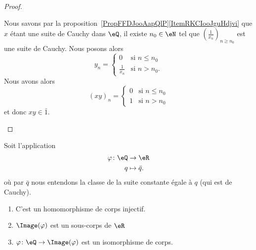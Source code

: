 \begin{proof}
\begin{subproof}
        Nous savons par la proposition~\ref{PropFFDJooAapQlP}\ref{ItemRKCIooJguHdjvi} que \( x\) étant une suite de Cauchy dans \( \eQ\), il existe \( n_0\in \eN\) tel que \( \left( \frac{1}{ x_n } \right)_{n\geq n_0}\) est une suite de Cauchy. Nous posons alors
        \begin{equation}
            y_n=\begin{cases}
                0    &   \text{si } n\leq n_0\\
                \frac{1}{ x_n }    &    \text{si } n>n_0.
            \end{cases}
        \end{equation}
        Nous avons alors
        \begin{equation}
            (xy)_n=\begin{cases}
                0    &   \text{si } n\leq n_0\\
                1    &    \text{si } n>n_0
            \end{cases}
        \end{equation}
        et donc \( xy\in\bar 1\).
    \end{subproof}
\end{proof}

\begin{proposition}     \label{PropooEPFCooMtDOfP}
    Soit l'application
    \begin{equation}
        \begin{aligned}
            \varphi\colon \eQ&\to \eR \\
            q&\mapsto \bar q .
        \end{aligned}
    \end{equation}
    où par \( \bar q\) nous entendons la classe de la suite constante égale à \( q\) (qui est de Cauchy).
    \begin{enumerate}
        \item
            C'est un homomorphisme de corps injectif.
        \item
            \( \Image(\varphi)\) est un sous-corps de \( \eR\)
        \item
            \( \varphi\colon \eQ\to \Image(\varphi)\) est un isomorphisme de corps.
    \end{enumerate}
\end{proposition}

